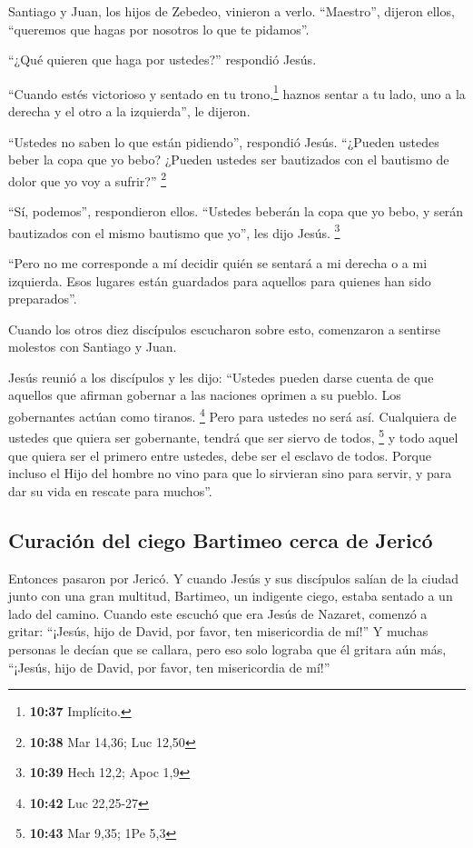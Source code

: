  Santiago y Juan, los hijos de Zebedeo, vinieron a verlo.
``Maestro'', dijeron ellos, ``queremos que hagas por nosotros lo que te
pidamos''.

 ``¿Qué quieren que haga por ustedes?'' respondió Jesús.

 ``Cuando estés victorioso y sentado en tu
trono,\footnote{\textbf{10:37} Implícito.} haznos sentar a tu lado, uno
a la derecha y el otro a la izquierda'', le dijeron.

 ``Ustedes no saben lo que están pidiendo'', respondió
Jesús. ``¿Pueden ustedes beber la copa que yo bebo? ¿Pueden ustedes ser
bautizados con el bautismo de dolor que yo voy a sufrir?'' \footnote{\textbf{10:38}
  Mar 14,36; Luc 12,50}

 ``Sí, podemos'', respondieron ellos. ``Ustedes beberán
la copa que yo bebo, y serán bautizados con el mismo bautismo que yo'',
les dijo Jesús. \footnote{\textbf{10:39} Hech 12,2; Apoc 1,9}

 ``Pero no me corresponde a mí decidir quién se sentará a
mi derecha o a mi izquierda. Esos lugares están guardados para aquellos
para quienes han sido preparados''.

 Cuando los otros diez discípulos escucharon sobre esto,
comenzaron a sentirse molestos con Santiago y Juan.

 Jesús reunió a los discípulos y les dijo: ``Ustedes
pueden darse cuenta de que aquellos que afirman gobernar a las naciones
oprimen a su pueblo. Los gobernantes actúan como tiranos. \footnote{\textbf{10:42}
  Luc 22,25-27}  Pero para ustedes no será así.
Cualquiera de ustedes que quiera ser gobernante, tendrá que ser siervo
de todos, \footnote{\textbf{10:43} Mar 9,35; 1Pe 5,3}  y
todo aquel que quiera ser el primero entre ustedes, debe ser el esclavo
de todos.  Porque incluso el Hijo del hombre no vino para
que lo sirvieran sino para servir, y para dar su vida en rescate para
muchos''.

\hypertarget{curaciuxf3n-del-ciego-bartimeo-cerca-de-jericuxf3}{%
\subsection{Curación del ciego Bartimeo cerca de
Jericó}\label{curaciuxf3n-del-ciego-bartimeo-cerca-de-jericuxf3}}

 Entonces pasaron por Jericó. Y cuando Jesús y sus
discípulos salían de la ciudad junto con una gran multitud, Bartimeo, un
indigente ciego, estaba sentado a un lado del camino. 
Cuando este escuchó que era Jesús de Nazaret, comenzó a gritar:
``¡Jesús, hijo de David, por favor, ten misericordia de mí!''
 Y muchas personas le decían que se callara, pero eso
solo lograba que él gritara aún más, ``¡Jesús, hijo de David, por favor,
ten misericordia de mí!''

